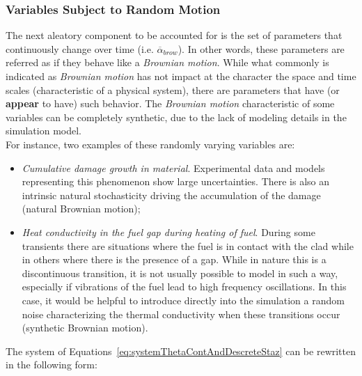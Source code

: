 \subsubsection{Variables Subject to Random Motion}
The next aleatory component to be accounted for is the set of parameters that continuously change over time (i.e. $\overline{\alpha}_{brow}$).
In other words,  these parameters are referred as if they behave like a \textit{Brownian motion}.
While what commonly is indicated as \textit{Brownian motion} has not impact at the character
the space and time scales (characteristic of a physical system), there are parameters that have (or \textbf{appear}
to have) such behavior. The  \textit{Brownian motion} characteristic of some variables can be completely
synthetic, due to the lack of modeling details in the simulation model.
\\For instance, two examples of these randomly varying variables are:
\begin{itemize}
  \item \textit{Cumulative damage growth in material}. Experimental data and models representing this
  phenomenon show large uncertainties. There is also an intrinsic natural stochasticity driving
  the accumulation of the damage (natural Brownian motion);
  \item \textit{Heat conductivity in the fuel gap during heating of fuel}. During some transients there are
  situations where the fuel is in contact with the clad while in others where there is the presence of a gap. While in
  nature this is a discontinuous transition, it is not usually possible to model in such a way, especially if vibrations
  of the fuel lead to high frequency oscillations. In this case, it would be helpful to introduce directly into the
  simulation a random noise characterizing the thermal conductivity when these transitions occur (synthetic
  Brownian motion).
\end{itemize}
The system of Equations~\ref{eq:systemThetaContAndDescreteStaz} can be rewritten in the following form:


